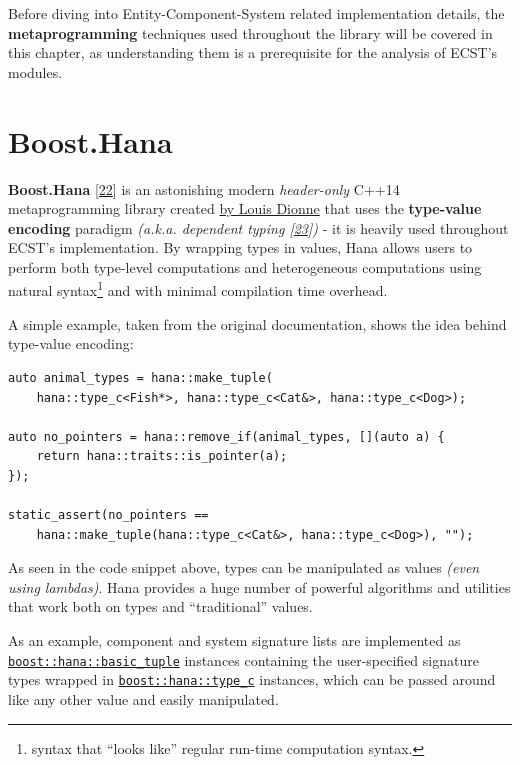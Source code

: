 \documentclass[oneside, 12pt, a4paper, openany]{book}
\begin{document}
Before diving into Entity-Component-System related implementation
details, the \textbf{metaprogramming} techniques used throughout the
library will be covered in this chapter, as understanding them is a
prerequisite for the analysis of ECST's modules.

\section{Boost.Hana}\label{boost.hana}

\textbf{Boost.Hana} {[}\protect\hyperlink{ref-boosthana}{22}{]} is an
astonishing modern \emph{header-only} C++14 metaprogramming library
created \href{http://ldionne.com/}{by Louis Dionne} that uses the
\textbf{type-value encoding} paradigm \emph{(a.k.a. dependent typing
{[}\protect\hyperlink{ref-pfultz2_dependentyping}{23}{]})} - it is
heavily used throughout ECST's implementation. By wrapping types in
values, Hana allows users to perform both type-level computations and
heterogeneous computations using natural syntax\footnote{syntax that
  ``looks like'' regular run-time computation syntax.} and with minimal
compilation time overhead.

A simple example, taken from the original documentation, shows the idea
behind type-value encoding:

\begin{verbatim}
auto animal_types = hana::make_tuple(
    hana::type_c<Fish*>, hana::type_c<Cat&>, hana::type_c<Dog>);

auto no_pointers = hana::remove_if(animal_types, [](auto a) {
    return hana::traits::is_pointer(a);
});

static_assert(no_pointers ==
    hana::make_tuple(hana::type_c<Cat&>, hana::type_c<Dog>), "");
\end{verbatim}

As seen in the code snippet above, types can be manipulated as values
\emph{(even using lambdas)}. Hana provides a huge number of powerful
algorithms and utilities that work both on types and ``traditional''
values.

As an example, component and system signature lists are implemented as
\href{http://www.boost.org/doc/libs/1_61_0/libs/hana/doc/html/structboost_1_1hana_1_1basic__tuple.html}{\texttt{boost::hana::basic_tuple}}
instances containing the user-specified signature types wrapped in
\href{http://www.boost.org/doc/libs/1_61_0/libs/hana/doc/html/structboost_1_1hana_1_1type.html\#ae35139e732c4b75e91061513cf445628}{\texttt{boost::hana::type_c}}
instances, which can be passed around like any other value and easily
manipulated.
\end{document}
